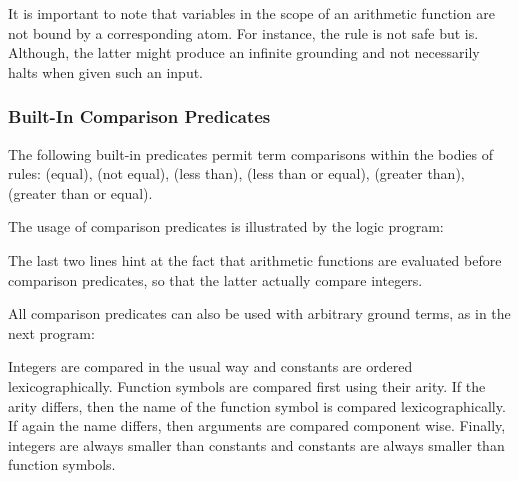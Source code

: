 It is important to note that variables
in the scope of an arithmetic function are not bound by a corresponding atom.
For instance, the rule  is not safe but  is.
Although, the latter might produce an infinite grounding 
and \gringo{} not necessarily halts when given such an input.

\subsubsection{Built-In Comparison Predicates}\label{subsec:gringo:comp}

The following built-in predicates permit term comparisons
within the bodies of rules:
\code{==} (equal),
\code{!=} (not equal),
\code{<} (less than),
\code{<=} (less than or equal),
\code{>} (greater than),
\code{>=} (greater than or equal).

\begin{example}\label{ex:arith:pred}
The usage of comparison predicates is illustrated by the logic program:%
%

%
The last two lines hint at the fact that arithmetic functions are evaluated
before comparison predicates, so that the latter actually compare integers.

All comparison predicates can also be used with arbitrary ground terms,
as in the next program:%
%

%
Integers are compared in the usual way and constants are ordered lexicographically.
Function symbols are compared first using their arity.
If the arity differs, then the name of the function symbol is compared lexicographically.
If again the name differs, then arguments are compared component wise.
Finally, integers are always smaller than constants and constants are always smaller than function symbols.
\eexample
{}
\end{example}

